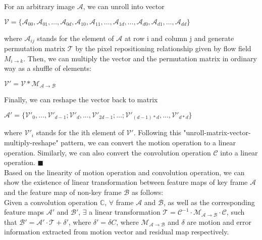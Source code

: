 \documentclass[titlepage]{article}
\newcommand*{\QEDA}{\hfill\ensuremath{\blacksquare}}
\begin{document}
For an arbitrary image $\mathcal{A}$, we can unroll into vector
\begin{center}
    $\mathcal{V} = \{ \mathcal{A}_{00},\mathcal{A}_{01}, \dots, \mathcal{A}_{0d}, \mathcal{A}_{10},\mathcal{A}_{11}, \dots, \mathcal{A}_{1d},\dots,\mathcal{A}_{d0},\mathcal{A}_{d1}, \dots,\mathcal{A}_{dd}\}$
\end{center}
where $\mathcal{A}_{ij}$ stands for the element of $\mathcal{A}$ at row i and column j and generate permutation matrix $\mathcal{T}$ by the pixel repositioning relationship given by flow field $M_{i \to k}$.
Then, we can multiply the vector and the permutation matrix in ordinary way as a shuffle of elements:
\begin{center}
    $\mathcal{V'} = \mathcal{V} * \mathcal{M}_{\mathcal{A} \to \mathcal{B}}$
\end{center}
Finally, we can reshape the vector back to matrix
\begin{center}
    $\mathcal{A'} = \{\mathcal{V'}_{0}, \dots, \mathcal{V'}_{d - 1}; \mathcal{V'}_{d}, \dots, \mathcal{V'}_{2d-1}; \dots ; \mathcal{V'}_{(d-1)*d}, \dots, \mathcal{V'}_{d*d} \}$
\end{center}
where $\mathcal{V'}_{i}$ stands for the ith element of $\mathcal{V'}$. 
Following this "unroll-matrix-vector-multiply-reshape" pattern, we can convert the motion operation to a linear operation. 
Similarly, we can also convert the convolution operation $\mathcal{C}$ into a linear operation.
\QEDA \\

Based on the linearity of motion operation and convolution operation, we can show the existence of linear transformation between feature maps of key frame $\mathcal{A}$ and the feature map of non-key frame $\mathcal{B}$ as follows: \\

 Given a convolution operation $\mathbb{C}$, $\forall$ frame $\mathcal{A}$ and $\mathcal{B}$, as well as the corresponding feature maps $\mathcal{A'}$ and $\mathcal{B'}$, $\exists$ a linear transformation $\mathcal{T} = \mathcal{C}^{-1}\cdot \mathcal{M}_{\mathcal{A} \to \mathcal{B}} \cdot \mathcal{C}$, such that $\mathcal{B'} = \mathcal{A'} \cdot \mathcal{T} + \mathcal{\delta'}$, where $\mathcal{\delta'} = \mathcal{\delta}C$, where $\mathcal{M}_{\mathcal{A} \to \mathcal{B}}$ and $\mathcal{\delta}$ are motion and error information extracted from motion vector and residual map respectively.\\
\end{document}
